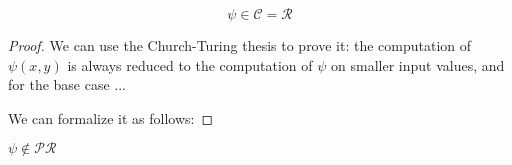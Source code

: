 \begin{theorem}
  \[\psi \in \mathcal{C} = \mathcal{R}\]
  \begin{proof}
    We can use the Church-Turing thesis to prove it: the computation
    of $\psi(x,y)$ is always reduced to the computation of $\psi$ on
    smaller input values, and for the base case ...

    We can formalize it as follows:
    
  \end{proof}
\end{theorem}

\begin{theorem}{$\psi \notin \mathcal{PR}$}

\end{theorem}
